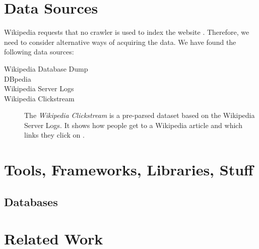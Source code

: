 \section{Data Sources}
Wikipedia requests that no crawler is used to index the website . Therefore, we need to consider alternative ways of acquiring the data. We have found the following data sources:
\begin{description}
  \item[Wikipedia Database Dump]
  \item[DBpedia]
  \item[Wikipedia Server Logs] 
  \item[Wikipedia Clickstream] The \emph{Wikipedia Clickstream} is a pre-parsed dataset based on the Wikipedia Server Logs. It shows how people get to a Wikipedia article and which links they click on \cite{wiki-clickstream}.
\end{description}

\section{Tools, Frameworks, Libraries, Stuff}\label{sec:selecting_tools}

\subsection{Databases}



\section{Related Work}\label{sec:related_work}
\dummy